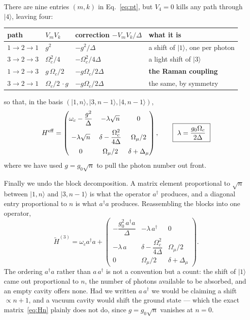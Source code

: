 \documentclass[11pt,a4paper]{article}
\newcommand{\ket}[1]{\lvert #1 \rangle}
\newcommand{\dg}{^{\dagger}}
\newcommand{\Om}{\Omega}
\newcommand{\Omu}{\Omega_{\mu}}
\newcommand{\Dmu}{\Delta_{\mu}}
\begin{document}
There are nine entries $(m,k)$ in Eq.~\eqref{eq:pt}, but $V_4=0$ kills any path through
$\ket{4}$, leaving four:
\begin{center}\small
\begin{tabular}{@{}llll@{}}
\toprule
path & $V_mV_k$ & correction $-V_mV_k/\Delta$ & what it is \\
\midrule
$1\to2\to1$ & $g^2$ & $-g^2/\Delta$ & a shift of $\ket{1}$, one per photon \\
$3\to2\to3$ & $\Om_c^2/4$ & $-\Om_c^2/4\Delta$ & a light shift of $\ket{3}$ \\
$1\to2\to3$ & $g\,\Om_c/2$ & $-g\Om_c/2\Delta$ & \textbf{the Raman coupling} \\
$3\to2\to1$ & $\Om_c/2\,\cdot g$ & $-g\Om_c/2\Delta$ & the same, by symmetry \\
\bottomrule
\end{tabular}
\end{center}
\vspace{3pt}
so that, in the basis $(\ket{1,n},\ket{3,n\!-\!1},\ket{4,n\!-\!1})$,
\begin{equation}
  H^{\rm eff} =
  \begin{pmatrix}
    \omega_c-\dfrac{g^2}{\Delta} & -\lambda\sqrt n & 0\\[9pt]
    -\lambda\sqrt n & \delta-\dfrac{\Om_c^2}{4\Delta} & \Omu/2\\[9pt]
    0 & \Omu/2 & \delta+\Dmu
  \end{pmatrix},
  \qquad
  \boxed{\ \lambda=\frac{g_0\Om_c}{2\Delta}\ }
  \label{eq:Heffn}
\end{equation}
where we have used $g=g_0\sqrt n$ to pull the photon number out front.

Finally we undo the block decomposition. A matrix element proportional to $\sqrt n$ between
$\ket{1,n}$ and $\ket{3,n\!-\!1}$ is what the operator $a\dg$ produces, and a diagonal entry
proportional to $n$ is what $a\dg a$ produces. Reassembling the blocks into one operator,
\begin{equation}
  \tilde H^{(3)} = \omega_c a\dg a +
  \begin{pmatrix}
    -\dfrac{g_0^2\,a\dg a}{\Delta} & -\lambda\,a\dg & 0 \\[9pt]
    -\lambda\,a & \delta - \dfrac{\Om_c^2}{4\Delta} & \Omu/2 \\[9pt]
    0 & \Omu/2 & \delta+\Dmu
  \end{pmatrix}.
  \label{eq:H3}
\end{equation}
The ordering $a\dg a$ rather than $a\,a\dg$ is not a convention but a count: the shift of
$\ket{1}$ came out proportional to $n$, the number of photons available to be absorbed, and an
empty cavity offers none. Had we written $a\,a\dg$ we would be claiming a shift $\propto n+1$,
and a vacuum cavity would shift the ground state --- which the exact matrix~\eqref{eq:Hn} plainly
does not do, since $g=g_0\sqrt n$ vanishes at $n=0$.
\end{document}
